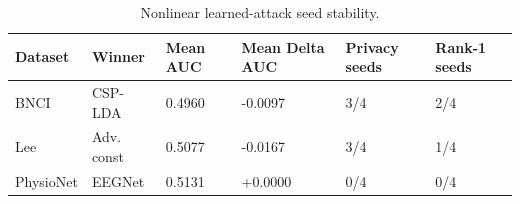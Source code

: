 \begin{table}[t]
\centering
\caption{Nonlinear learned-attack seed stability.}
\label{tab:mlp-seed-stability}
\begin{tabular}{llllll}
\toprule
Dataset & Winner & Mean AUC & Mean Delta AUC & Privacy seeds & Rank-1 seeds \\
\midrule
BNCI & CSP-LDA & 0.4960 & -0.0097 & 3/4 & 2/4 \\
Lee & Adv. const & 0.5077 & -0.0167 & 3/4 & 1/4 \\
PhysioNet & EEGNet & 0.5131 & +0.0000 & 0/4 & 0/4 \\
\bottomrule
\end{tabular}
\end{table}
